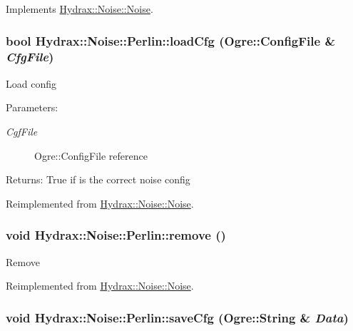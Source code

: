Implements \hyperlink{class_hydrax_1_1_noise_1_1_noise_5b18138d5c2c5ea3c3659cef80dd3a3e}{Hydrax::Noise::Noise}.\hypertarget{class_hydrax_1_1_noise_1_1_perlin_3a2dab14cfbda1ccf8fc5de4bb89f124}{
\subsubsection[{loadCfg}]{\setlength{\rightskip}{0pt plus 5cm}bool Hydrax::Noise::Perlin::loadCfg (Ogre::ConfigFile \& {\em CfgFile})}}
\label{class_hydrax_1_1_noise_1_1_perlin_3a2dab14cfbda1ccf8fc5de4bb89f124}


Load config \begin{Desc}
\item[Parameters:]
\begin{description}
\item[{\em CgfFile}]Ogre::ConfigFile reference \end{description}
\end{Desc}
\begin{Desc}
\item[Returns:]True if is the correct noise config \end{Desc}


Reimplemented from \hyperlink{class_hydrax_1_1_noise_1_1_noise_5ef6e71282a9dfcefc09e3ba84a7578f}{Hydrax::Noise::Noise}.\hypertarget{class_hydrax_1_1_noise_1_1_perlin_666010a5142bbb2b03c97aa5aa7bdef1}{
\subsubsection[{remove}]{\setlength{\rightskip}{0pt plus 5cm}void Hydrax::Noise::Perlin::remove ()}}
\label{class_hydrax_1_1_noise_1_1_perlin_666010a5142bbb2b03c97aa5aa7bdef1}


Remove 

Reimplemented from \hyperlink{class_hydrax_1_1_noise_1_1_noise_00c4aaa7604ea492740318d01f651606}{Hydrax::Noise::Noise}.\hypertarget{class_hydrax_1_1_noise_1_1_perlin_4f1f70a3375ac2b2f5e09011e7cc7ef3}{
\subsubsection[{saveCfg}]{\setlength{\rightskip}{0pt plus 5cm}void Hydrax::Noise::Perlin::saveCfg (Ogre::String \& {\em Data})}}
\label{class_hydrax_1_1_noise_1_1_perlin_4f1f70a3375ac2b2f5e09011e7cc7ef3}


